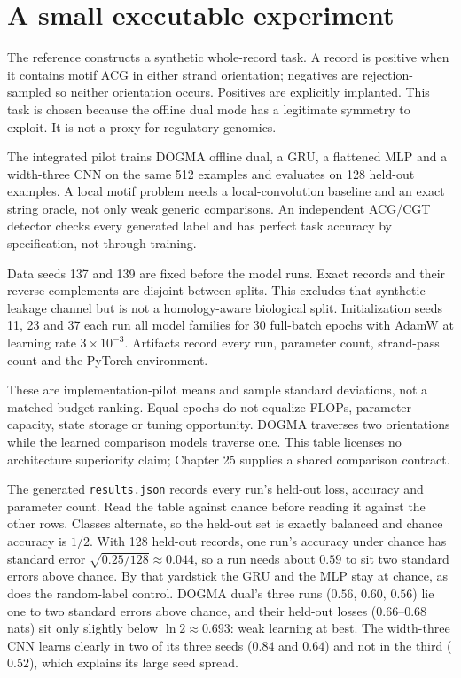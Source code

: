 \section{A small executable experiment}

The reference constructs a synthetic whole-record task. A record is positive when it
contains motif ACG in either strand orientation; negatives are rejection-sampled so
neither orientation occurs. Positives are explicitly implanted. This task is chosen
because the offline dual mode has a legitimate symmetry to exploit. It is not a
proxy for regulatory genomics.

The integrated pilot trains DOGMA offline dual, a GRU, a flattened MLP and a
width-three CNN on the same 512 examples and evaluates on 128 held-out examples.
A local motif problem needs a local-convolution baseline and an exact string
oracle, not only weak generic comparisons. An independent ACG/CGT detector
checks every generated label and has perfect task accuracy by specification,
not through training.

Data seeds 137 and 139 are fixed before the model runs. Exact records and their
reverse complements are disjoint between splits. This excludes that synthetic
leakage channel but is not a homology-aware biological split. Initialization
seeds 11, 23 and 37 each run all model families for 30 full-batch epochs with
AdamW at learning rate $3\times10^{-3}$. Artifacts record every run, parameter
count, strand-pass count and the PyTorch environment.

\begin{center}\end{center}
These are implementation-pilot means and sample standard deviations, not a
matched-budget ranking. Equal epochs do not equalize FLOPs, parameter capacity,
state storage or tuning opportunity. DOGMA traverses two orientations while
the learned comparison models traverse one. This table licenses no architecture
superiority claim; Chapter 25 supplies a shared comparison contract.

The generated \texttt{results.json} records every run's held-out loss, accuracy and
parameter count. Read the table against chance before reading it against the other
rows. Classes alternate, so the held-out set is exactly balanced and chance accuracy
is $1/2$. With 128 held-out records, one run's accuracy under chance has standard error
$\sqrt{0.25/128}\approx0.044$, so a run needs about $0.59$ to sit two standard errors
above chance. By that yardstick the GRU and the MLP stay at chance, as does the
random-label control. DOGMA dual's three runs ($0.56$, $0.60$, $0.56$) lie one to two
standard errors above chance, and their held-out losses ($0.66$--$0.68$ nats) sit only
slightly below $\ln2\approx0.693$: weak learning at best. The width-three CNN learns
clearly in two of its three seeds ($0.84$ and $0.64$) and not in the third ($0.52$),
which explains its large seed spread.

